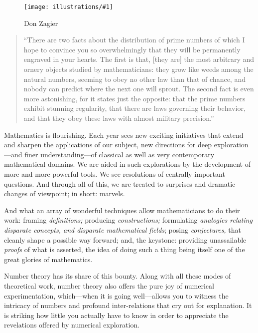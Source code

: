 \documentclass[openany]{book}
\newcommand{\ill}[3]{%
   \begin{figure}[H]%
   \vspace{-2ex}
   \centering%
   \texttt{[image: illustrations/\#1]}%
   \caption{#3}%
   \vspace{-2ex}
    \end{figure}}
\theoremstyle{plain}
\theoremstyle{definition}
\begin{document}
\ill{zagier}{.35}{Don Zagier}


\begin{quote}
  ``There are two facts about the distribution of prime numbers of
  which I hope to convince you so overwhelmingly that they will be
  permanently engraved in your hearts. The first is that, [they are]
  the most arbitrary and ornery objects studied by mathematicians:
  they grow like weeds among the natural numbers, seeming to obey no
  other law than that of chance, and nobody can predict where the next
  one will sprout. The second fact is even more astonishing, for it
  states just the opposite: that the prime numbers exhibit stunning
  regularity, that there are laws governing their behavior, and that
  they obey these laws with almost military precision.''
\end{quote}


 Mathematics is flourishing.  Each year sees new exciting initiatives that extend and sharpen the applications of our subject,   new directions for  deep  exploration---and finer understanding---of  classical as well as very contemporary mathematical domains. We are aided in such explorations by the development of more and more powerful tools. We  see resolutions of centrally important questions.  And through all of this, we are treated to surprises and dramatic changes of viewpoint; in short: marvels.

 And what an array of wonderful techniques  allow mathematicians to do their work:  framing {\it definitions;} producing {\it constructions;  }formulating {\it analogies relating disparate concepts, and disparate  mathematical fields}; posing {\it  conjectures,} that cleanly shape a possible way forward; and, the keystone: providing unassailable {\it proofs} of what is asserted,  the idea of doing such a thing being itself one of the great glories of mathematics.

    Number theory has its share of this bounty. Along with all these modes of theoretical work,  number theory also offers the pure joy of numerical experimentation, which---when it is going well---allows you to witness the intricacy of numbers and  profound inter-relations that cry out for explanation. It is striking how little you actually have to know in order to appreciate the  revelations offered by numerical exploration.
\end{document}
